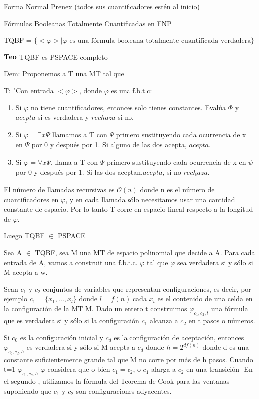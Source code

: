 \documentclass{homework}
\begin{document}
Forma Normal Prenex (todos sus cuantificadores estén al inicio)

Fórmulas Booleanas Totalmente Cuantificadas en FNP

TQBF =  $\{<\varphi> | \varphi \text{ es una fórmula booleana totalmente cuantificada verdadera} \}$

$\bf{Teo}$ TQBF es PSPACE-completo

Dem:
Proponemos a T una MT tal que 

T: "Con entrada $<\varphi>$, donde $\varphi$ es una f.b.t.c:
\begin{enumerate}
	\item Si $\varphi$ no tiene cuantificadores, entonces solo tienes constantes. Evalúa $\varPhi$ y $\underline{acepta}$ si es verdadera y $\underline{rechaza}$ si no.
	\item Si $\varphi = \exists x \varPsi$ llamamos a T con $\varPsi$ primero sustituyendo cada ocurrencia de x en $\varPsi$ por 0 y después por 1. Si alguno de las dos acepta, $\underline{acepta}$.
	\item Si $\varphi = \forall x \varPsi$, llama a T con $\varPsi$ primero sustituyendo cada ocurrencia de x en $\psi$ por 0 y después por 1. Si las dos aceptan,$\underline{acepta}$, si no $\underline{rechaza}$.
\end{enumerate}

El número de llamadas recursivas es $\mathcal{O}(n)$ donde n es el número de cuantificadores en $\varphi$, y en cada llamada sólo necesitamos usar una cantidad constante de espacio. Por lo tanto T corre en espacio lineal respecto a la longitud de $\varphi$.

Luego TQBF $\in$ PSPACE

Sea A $\in$ TQBF, sea M una MT de espacio polinomial que decide a A. Para cada entrada de A, vamos a construit una f.b.t.c. $\varphi$ tal que $\varphi$ sea verdadera si y sólo si M acepta a w.

Sean $c_1$ y $c_2$ conjuntos de variables que representan configuraciones, es decir, por ejemplo $c_1 = \{x_1 ,..., x_l\}$ donde $l = f(n)$ cada $x_i$ es el contenido de una celda en la configuración de la MT M. Dado un entero t construimos $\varphi_{c_1,c_2,t}$ una fórmula que es verdadera si y sólo si la configuración $c_1$ alcanza a $c_2$ en t pasos o números.

Si $c_0$ es la configuración inicial y $c_d$ es la configuración de aceptación, entonces $\varphi_{c_0,c_d,h}$ es verdadera si y sólo si M acepta a $c_d$ donde $h = 2^{df(n)}$ donde d es una constante suficientemente grande tal que M no corre por más de h pasos. Cuando t=1 $\varphi_{c_0,c_d,h}$ $\varphi$ considera que o bien $c_1 = c_2$, o $c_1$ alarga a $c_2$ en una transición- En el segundo , utilizamos la fórmula del Teorema de Cook para las ventanas suponiendo que $c_1$ y $c_2$ son configuraciones adyacentes.
\end{document}
